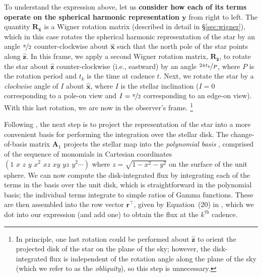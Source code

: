 \documentclass[modern,linenumbers]{aastex62}
\newcommand{\edited}[1]{\textbf{#1}}
\begin{document}
%
To understand the expression above, let us \edited{consider how each of its terms operate on
    the spherical harmonic representation $\mathbf{y}$} from right to left.
The quantity $\mathbf{R}_{\hat{\mathbf{x}}}$
is a Wigner rotation matrix
(described in detail in \S\ref{sec:wigner}),
which in this case rotates the spherical harmonic representation
of the star by an angle $\nicefrac{\pi}{2}$ counter-clockwise about $\hat{\mathbf{x}}$
such that the north pole of the star points along $\hat{\mathbf{z}}$. In this
frame, we apply a second Wigner rotation matrix, $\mathbf{R}_{\hat{\mathbf{z}}}$,
to rotate the star about $\hat{\mathbf{z}}$ counter-clockwise (i.e., eastward) by an angle
$\nicefrac{2\pi t_k}{P}$, where $P$ is the rotation period and $t_k$ is the
time at cadence $t$.
Next, we rotate the star by a \emph{clockwise} angle of $I$ about $\hat{\mathbf{x}}$,
where $I$ is the stellar inclination ($I = 0$ corresponding to a pole-on view and
$I = \nicefrac{\pi}{2}$ corresponding to an edge-on view). With this last rotation,
we are now in the observer's frame.%
\footnote{In principle, one last rotation could be performed about $\hat{\mathbf{z}}$
    to orient the projected disk of the star on the plane of the sky; however, the disk-integrated
    flux is independent of the rotation angle along the plane of the sky
    (which we refer to as the \emph{obliquity}), so this step is unnecessary.}

Following \citet{Luger2019}, the next step is to project the representation of
the star into a more convenient basis for performing the integration over the stellar
disk. The change-of-basis matrix $\mathbf{A}_1$ \citep[see Appendix~B in][]{Luger2019}
projects the stellar map into the \emph{polynomial basis}
\citep[Equation~7 in][]{Luger2019}, comprised of the sequence of monomials in Cartesian
coordinates
$\left( 1 \,\, x \,\, z \,\, y \,\, x^2 \,\, xz \,\, xy \,\, yz \,\, y^2 \cdots \right)$
where $z = \sqrt{1 - x^2 - y^2}$ on the surface of the unit sphere. We
can now compute the disk-integrated flux by integrating each of the terms in the basis
over the unit disk, which is straightforward in the polynomial basis; the
individual terms integrate to simple ratios of Gamma functions. These are then
assembled into the row vector $\mathbf{r}^\top$, given by Equation~(20) in
\citet{Luger2019}, which we dot into our expression (and add one) to obtain the
flux at the $k^\mathrm{th}$ cadence.
\end{document}
